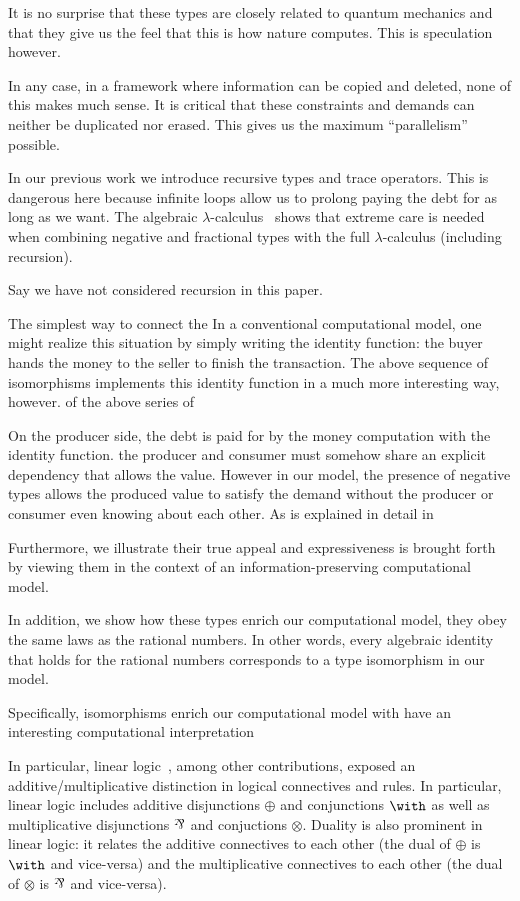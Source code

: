 \documentclass[preprint]{sigplanconf}
\begin{document}
It is no surprise that these types are closely related to quantum mechanics
and that they give us the feel that this is how nature computes. This is
speculation however.

In any case, in a framework where information can be copied and deleted, none
of this makes much sense. It is critical that these constraints and demands
can neither be duplicated nor erased.  This gives us the maximum
``parallelism'' possible.

In our previous work we introduce recursive types and trace operators. This
is dangerous here because infinite loops allow us to prolong paying the debt
for as long as we want. The algebraic
$\lambda$-calculus~\cite{Vaux:2009:ALC:1630585.1630590} shows that extreme
care is needed when combining negative and fractional types with the full
$\lambda$-calculus (including recursion).

Say we have not considered recursion in this paper.

The simplest way to connect the In a conventional computational model, one
might realize this situation by simply writing the identity function: the
buyer hands the money to the seller to finish the transaction. The above
sequence of isomorphisms implements this identity function in a much more
interesting way, however.  of the above series of

On the producer side, the debt is paid for by the money computation with the
identity function. the producer and consumer must somehow share an explicit
dependency that allows the value. However in our model, the presence of
negative types allows the produced value to satisfy the demand without the
producer or consumer even knowing about each other. As is explained in detail
in

Furthermore, we illustrate their true appeal and expressiveness is brought
forth by viewing them in the context of an information-preserving
computational model.

In addition, we show how these types enrich our computational model, they
obey the same laws as the rational numbers. In other words, every algebraic
identity that holds for the rational numbers corresponds to a type
isomorphism in our model.

Specifically, isomorphisms enrich our computational model with have an
interesting computational interpretation

In particular, linear logic~\cite{Girard87tcs}, among other contributions,
exposed an additive/multiplicative distinction in logical connectives and
rules. In particular, linear logic includes additive disjunctions $\oplus$
and conjunctions $\with$ as well as multiplicative disjunctions $\parr$ and
conjuctions $\otimes$. Duality is also prominent in linear logic: it relates
the additive connectives to each other (the dual of $\oplus$ is $\with$ and
vice-versa) and the multiplicative connectives to each other (the dual of
$\otimes$ is $\parr$ and vice-versa).
\end{document}
